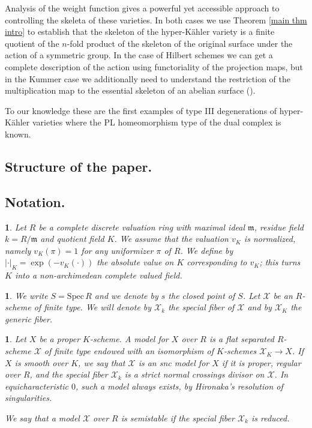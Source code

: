 \documentclass{amsart}%
\numberwithin{equation}{subsection}
\theoremstyle{plain2}
\theoremstyle{definition2}
\theoremstyle{stepstyle}
\theoremstyle{point}
\theoremstyle{subpoint}
\newtheorem{subpoint}[equation]{}%
\newcommand{\spa}[1]{\begin{subpoint}#1\end{subpoint}}           %
\newcommand{\cX}{\ensuremath{\mathscr{X}}}
\newcommand{\mm}{\ensuremath{\mathfrak{m}}}
\newcommand{\Spec}{\ensuremath{\mathrm{Spec}\,}}
\begin{document}
Analysis of the weight function gives a powerful yet accessible approach to controlling the skeleta of these varieties. In both cases we use Theorem \ref{main thm intro} to establish that the skeleton of the hyper-K{\"a}hler variety is a finite quotient of the $n$-fold product of the skeleton of the original surface under the action of a symmetric group. In the case of Hilbert schemes we can get a complete description of the action using functoriality of the projection maps, but in the Kummer case we additionally need to understand the restriction of the multiplication map to the essential skeleton of an abelian surface (\cite{Berkovich1990, HalvardHalleNicaise2017, Temkina}).

To our knowledge these are the first examples of type III degenerations of hyper-K{\"a}hler varieties where the PL homeomorphism type of the dual complex is known. 

\subsection{Structure of the paper.}


\subsection{Notation.}
\spa{Let $R$ be a complete discrete valuation ring with maximal ideal $\mm$, residue field $k=R/\mm$ and quotient field $K$. We assume that the valuation $v_K$ is normalized, namely $v_K(\pi)=1$ for any uniformizer $\pi$ of $R$. We define by $|\cdot|_K= \exp(- v_K(\cdot))$ the absolute value on $K$ corresponding to $v_K$; this turns $K$ into a non-archimedean complete valued field.}

\spa{ We write $S=\Spec R$ and we denote by $s$ the closed point of $S$. Let $\cX$ be an $R$-scheme of finite type. We will denote by $\cX_k$ the special fiber of $\cX$ and by $\cX_K$ the generic fiber. %
}

\spa{Let $X$ be a proper $K$-scheme. A model for $X$ over $R$ is a flat separated $R$-scheme $\cX$ of finite type endowed with an isomorphism of $K$-schemes $\cX_K \rightarrow X$. If $X$ is smooth over $K$,
we say that $\cX$ is an snc model for $X$ if it is proper, regular over $R$, and the
special fiber $\cX_k$ is a strict normal crossings divisor on $\cX$. In equicharacteristic $0$, such a model always exists, by Hironaka's resolution of singularities.

We say that a model $\cX$ over $R$ is semistable if the special fiber $\cX_k$ is reduced.}
\end{document}
